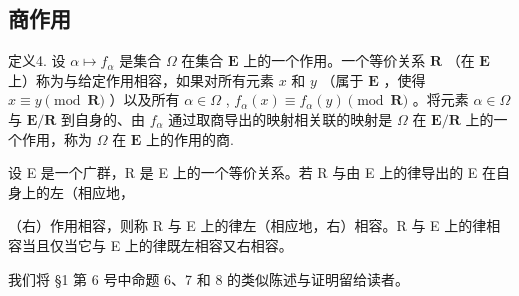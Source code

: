 \subsection{商作用}

定义4. 设 \(\alpha \mapsto f_{\alpha}\) 是集合 \(\Omega\) 在集合 \(\mathbf{E}\) 上的一个作用。一个等价关系 \(\mathbf{R}\) （在 \(\mathbf{E}\) 上）称为与给定作用相容，如果对所有元素 \(x\) 和 \(y\) （属于 \(\mathbf{E}\) ，使得 \(x \equiv y \pmod{\mathbf{R}}\) ）以及所有 \(\alpha \in \Omega\) , \(f_{\alpha}(x) \equiv f_{\alpha}(y) \pmod{\mathbf{R}}\) 。将元素 \(\alpha \in \Omega\) 与 \(\mathbf{E} / \mathbf{R}\) 到自身的、由 \(f_{\alpha}\) 通过取商导出的映射相关联的映射是 \(\Omega\) 在 \(\mathbf{E} / \mathbf{R}\) 上的一个作用，称为 \(\Omega\) 在 \(\mathbf{E}\) 上的作用的商.

设 E 是一个广群，R 是 E 上的一个等价关系。若 R 与由 E 上的律导出的 E 在自身上的左（相应地，

（右）作用相容，则称 R 与 E 上的律左（相应地，右）相容。R 与 E 上的律相容当且仅当它与 E 上的律既左相容又右相容。

我们将 §1 第 6 号中命题 6、7 和 8 的类似陈述与证明留给读者。
\relax{}
